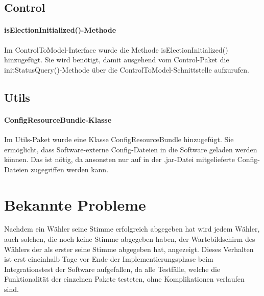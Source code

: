 \documentclass[parskip=full]{scrartcl}
\begin{document}
\subsection{Control}
\paragraph{isElectionInitialized()-Methode}
Im ControlToModel-Interface wurde die Methode isElectionInitialized() hinzugefügt. Sie wird benötigt, damit ausgehend vom Control-Paket die initStatusQuery()-Methode über die ControlToModel-Schnittstelle aufzurufen.

\subsection{Utils}
\paragraph{ConfigResourceBundle-Klasse}
Im Utils-Paket wurde eine Klasse ConfigResourceBundle hinzugefügt. Sie ermöglicht, dass Software-externe Config-Dateien in die Software geladen werden können. Das ist nötig, da ansonsten nur auf in der .jar-Datei mitgelieferte Config-Dateien zugegriffen werden kann.


\section{Bekannte Probleme} 
\label{sect:problem}
Nachdem ein Wähler seine Stimme erfolgreich abgegeben hat wird jedem Wähler, auch solchen, die noch keine Stimme abgegeben haben, der Wartebildschirm des Wählers der als erster seine Stimme abgegeben hat, angezeigt.
Dieses Verhalten ist erst eineinhalb Tage vor Ende der Implementierungsphase beim Integrationstest der Software aufgefallen, da alle Testfälle, welche die Funktionalität der einzelnen Pakete testeten, ohne Komplikationen verlaufen sind.
\end{document}
